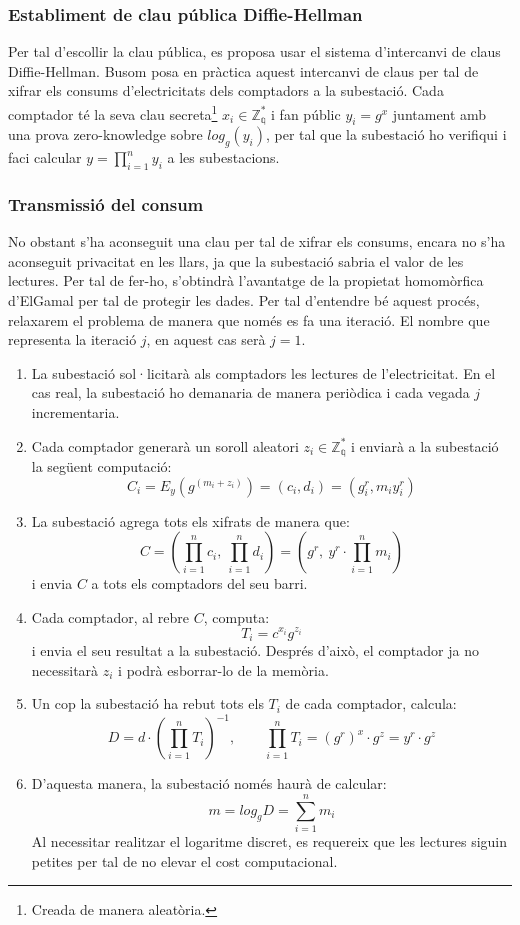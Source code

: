 \documentclass{article}
\begin{document}
\subsubsection{Establiment de clau pública Diffie-Hellman}
Per tal d'escollir la clau pública, es proposa usar el sistema d'intercanvi de claus Diffie-Hellman. Busom \cite{busom} posa en pràctica aquest intercanvi de claus per tal de xifrar els consums d'electricitats dels comptadors a la subestació. Cada comptador té la seva clau secreta\footnote{Creada de manera aleatòria.} $x_i \in \mathbb{Z_q^*} $ i fan públic $y_i = g^x$ juntament amb una prova zero-knowledge sobre $log_g(y_i)$, per tal que la subestació ho verifiqui i faci calcular $y = \prod_{i=1}^{n} y_i$ a les subestacions.
\subsubsection{Transmissió del consum}
No obstant s'ha aconseguit una clau per tal de xifrar els consums, encara no s'ha aconseguit privacitat en les llars, ja que la subestació sabria el valor de les lectures. Per tal de fer-ho, s'obtindrà l'avantatge de la propietat homomòrfica d'ElGamal per tal de protegir les dades. Per tal d'entendre bé aquest procés, relaxarem el problema de manera que només es fa una iteració. El nombre que representa la iteració $j$, en aquest cas serà $j = 1$.
\begin{enumerate}
	\item La subestació sol·licitarà als comptadors les lectures de l'electricitat. En el cas real, la subestació ho demanaria de manera periòdica i cada vegada $j$ incrementaria.
	\item Cada comptador generarà un soroll aleatori $z_i \in \mathbb{Z_q^*}$ i enviarà a la subestació la següent computació:
	\[C_i = E_y(g^{(m_i + z_i)}) = (c_i, d_i) = (g^r_i, m_i y^r_i)\]
	\item La subestació agrega tots els xifrats de manera que:
	\[C = (\prod_{i=1}^{n} c_i, \ \prod_{i=1}^{n} d_i) = (g^r, \ y^r \cdot \prod_{i=1}^{n} m_i)\]
	i envia $C$ a tots els comptadors del seu barri.
	\item Cada comptador, al rebre $C$, computa:
	\[T_i = c^{x_i} g^{z_i}\]
	i envia el seu resultat a la subestació. Després d'això, el comptador ja no necessitarà $z_i$ i podrà esborrar-lo de la memòria.
	\item Un cop la subestació ha rebut tots els $T_i$ de cada comptador, calcula:
	\[D = d \cdot (\prod_{i=1}^{n} T_i)^{-1}, \qquad \prod_{i=1}^{n} T_i = (g^{r})^x \cdot g^z = y^r \cdot g^z\]
	\item D'aquesta manera, la subestació només haurà de calcular:
	\[m = log_g D = \sum_{i=1}^{n} m_i\]
	Al necessitar realitzar el logaritme discret, es requereix que les lectures siguin petites per tal de no elevar el cost computacional.
\end{enumerate}
\end{document}
